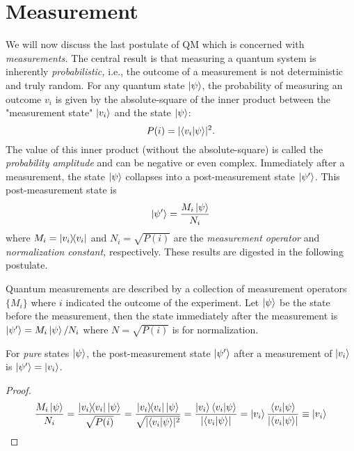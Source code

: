 	\section{Measurement}
		\label{sec:measurement}

		We will now discuss the last postulate of \ac{QM} which is concerned with \emph{measurements.} The central result is that measuring a quantum system is inherently \emph{probabilistic,} i.e., the outcome of a measurement is not deterministic and truly random. For any quantum state \( \ket{\psi} \), the probability of measuring an outcome \(v_i\) is given by the absolute-square of the inner product between the "measurement state" \(\ket{v_i}\) and the state \(\ket{\psi}\):
		\begin{equation}
			P(i) = \lvert \ip{v_i}{\psi} \rvert^2.
		\end{equation}
		The value of this inner product (without the absolute-square) is called the \emph{probability amplitude} and can be negative or even complex. Immediately after a measurement, the state \(\ket{\psi}\) collapses into a post-measurement state \(\ket{\psi'}\). This post-measurement state is
		\begin{equation}
			\ket{\psi'} = \frac{M_i \ket{\psi}}{N_i}
		\end{equation}
		where \( M_i = \op{v_i}{v_i} \) and \( N_i = \sqrt{P(i)} \) are the \emph{measurement operator} and \emph{normalization constant,} respectively. These results are digested in the following postulate.

		\begin{postulate}
			Quantum measurements are described by a collection of measurement operators \( \{ M_i \} \) where \(i\) indicated the outcome of the experiment. Let \(\ket{\psi}\) be the state before the measurement, then the state immediately after the measurement is \( \ket{\psi'} = M_i \ket{\psi} / N_i \) where \( N = \sqrt{P(i)} \) is for normalization.
		\end{postulate}

		\begin{theorem}
			For \emph{pure} states \(\ket{\psi}\), the post-measurement state \(\ket{\psi'}\) after a measurement of \(\ket{v_i}\) is \(\ket{\psi'} = \ket{v_i}\).
		\end{theorem}
		\begin{proof}
			\begin{equation}
				\frac{M_i \ket{\psi}}{N_i}
				= \frac{\op{v_i}{v_i} \ket{\psi}}{\sqrt{P(i)}}
				= \frac{\op{v_i}{v_i} \ket{\psi}}{\sqrt{\lvert \ip{v_i}{\psi} \rvert^2}}
				= \frac{\ket{v_i} \ip{v_i}{\psi}}{\lvert \ip{v_i}{\psi} \rvert}
				= \ket{v_i} \frac{\ip{v_i}{\psi}}{\lvert \ip{v_i}{\psi} \rvert}
				\equiv \ket{v_i}
			\end{equation}
		\end{proof}

